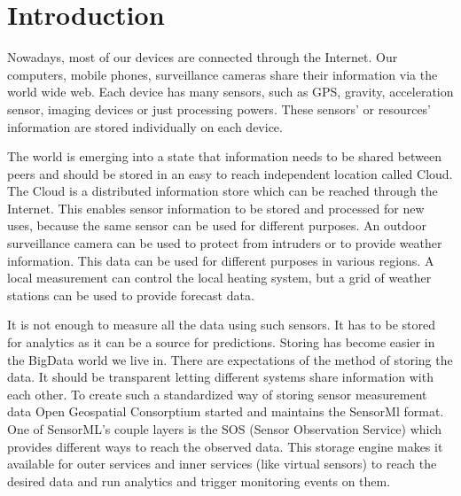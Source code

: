 \chapter*{Introduction}

Nowadays, most of our devices are connected through the Internet. Our computers, mobile phones, surveillance cameras share their information via the world wide web. Each device has many sensors, such as GPS, gravity, acceleration sensor, imaging devices or just processing powers. These sensors' or resources' information are stored individually on each device. 

The world is emerging into a state that information needs to be shared between peers and should be stored in an easy to reach independent location called Cloud. The Cloud is a distributed information store which can be reached through the Internet.
This enables sensor information to be stored and processed for new uses, because the same sensor can be used for different purposes. An outdoor surveillance camera can be used to protect from intruders or to provide weather information. This data can be used for different purposes in various regions. A local measurement can control the local heating system, but a grid of weather stations can be used to provide forecast data.
 
It is not enough to measure all the data using such sensors. It has to be stored for analytics as it can be a source for predictions. Storing has become easier in the BigData world we live in. There are expectations of the method of storing the data. It should be transparent letting different systems share information with each other. To create such a standardized way of storing sensor measurement data Open Geospatial Consorptium started and maintains the SensorMl format. One of SensorML's couple layers is the SOS (Sensor Observation Service) which provides different ways to reach the observed data. This storage engine makes it available for outer services and inner services (like virtual sensors) to reach the desired data and run analytics and trigger monitoring events on them.

